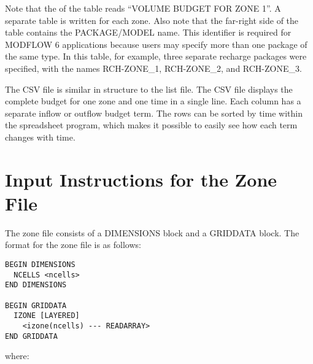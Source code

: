 \documentclass[11pt,twoside,twocolumn]{usgsreport}
\begin{document}
Note that the of the table reads ``VOLUME BUDGET FOR ZONE 1''.  A separate table is written for each zone.  Also note that the far-right side of the table contains the PACKAGE/MODEL name.  This identifier is required for MODFLOW 6 applications because users may specify more than one package of the same type.  In this table, for example, three separate recharge packages were specified, with the names RCH-ZONE\_1, RCH-ZONE\_2, and RCH-ZONE\_3.

The CSV file is similar in structure to the list file. The CSV file displays the complete budget for one zone and one time in a single line. Each column has a separate inflow or outflow budget term. The rows can be sorted by time within the spreadsheet program, which makes it possible to easily see how each term changes with time. 

\section{Input Instructions for the Zone File}

The zone file consists of a DIMENSIONS block and a GRIDDATA block.  The format for the zone file is as follows:

\begin{verbatim}
BEGIN DIMENSIONS
  NCELLS <ncells>
END DIMENSIONS

BEGIN GRIDDATA
  IZONE [LAYERED]
    <izone(ncells) --- READARRAY>
END GRIDDATA

\end{verbatim}

\noindent where:
\end{document}
